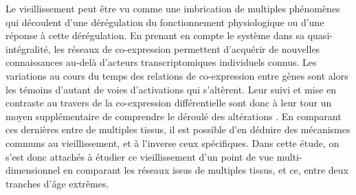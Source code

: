 Le vieillissement peut être vu comme une imbrication de multiples phénomènes qui découlent d'une dérégulation du fonctionnement physiologique ou d'une réponse à cette dérégulation. En prenant en compte le système dans sa quasi-intégralité, les réseaux de co-expression permettent d'acquérir de nouvelles connaissances au-delà d'acteurs transcriptomiques individuels connus. Les variations au cours du temps des relations de co-expression entre gènes sont alors les témoins d'autant de voies d'activations qui s'altèrent. Leur suivi et mise en contraste au travers de la co-expression différentielle sont donc à leur tour un moyen supplémentaire de comprendre le déroulé des altérations . En comparant ces dernières entre de multiples tissus, il est possible d'en déduire des mécanismes communs au vieillissement, et à l'inverse ceux spécifiques. Dans cette étude, on s'est donc attachés à étudier ce vieillissement d'un point de vue multi-dimensionnel en comparant les réseaux issus de multiples tissus, et ce, entre deux tranches d'âge extrêmes. 

